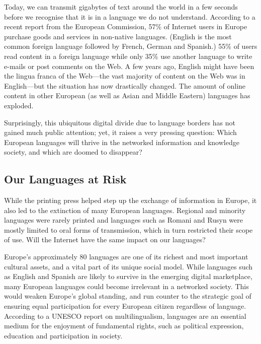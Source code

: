 \begin{multicols}{2}
Today, we can transmit gigabytes of text around the world in a few seconds before we recognise that it is in a language we do not understand. According to a recent report from the European Commission, 57\% of Internet users in Europe purchase goods and services in non-native languages. (English is the most common foreign language followed by French, German and Spanish.) 55\% of users read content in a foreign language while only 35\% use another language to write e-mails or post comments on the Web.\cite{EC1} A few years ago, English might have been the lingua franca of the Web—the vast majority of content on the Web was in English—but the situation has now drastically changed. The amount of online content in other European (as well as Asian and Middle Eastern) languages has exploded.

Surprisingly, this ubiquitous digital divide due to language borders has not gained much public attention; yet, it raises a very pressing question: Which European languages will thrive in the networked information and knowledge society, and which are doomed to disappear?

\subsection{Our Languages at Risk}
While the printing press helped step up the exchange of information in Europe, it also led to the extinction of many European languages. Regional and minority languages were rarely printed and languages such as Romani and Rusyn were mostly limited to oral forms of transmission, which in turn restricted their scope of use. Will the Internet have the same impact on our languages?

 
Europe’s approximately 80 languages are one of its richest and most important cultural assets, and a vital part of its unique social model.\cite{EC2} While languages such as English and Spanish are likely to survive in the emerging digital marketplace, many European languages could become irrelevant in a networked society. This would weaken Europe’s global standing, and run counter to the strategic goal of ensuring equal participation for every European citizen regardless of language. According to a UNESCO report on multilingualism, languages are an essential medium for the enjoyment of fundamental rights, such as political expression, education and participation in society.\cite{Unesco1}


\end{multicols}
